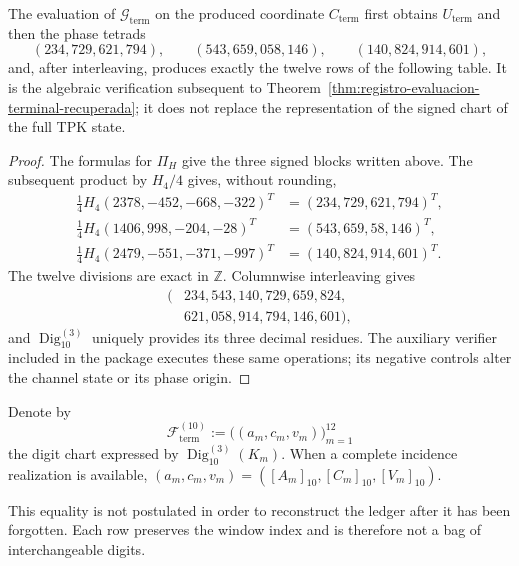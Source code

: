 \begin{proposition}
\label{prop:registro-generacion-modular-terminal}
The evaluation of \(\mathcal G_{\mathrm{term}}\) on the produced coordinate
\(C_{\mathrm{term}}\) first obtains \(U_{\mathrm{term}}\) and then the phase
tetrads
\[
 (234,729,621,794),\qquad(543,659,058,146),\qquad
 (140,824,914,601),
\]
and, after interleaving, produces exactly the twelve rows of the following
table. It is the algebraic verification subsequent to
Theorem~\ref{thm:registro-evaluacion-terminal-recuperada}; it does not replace
the representation of the signed chart of the full TPK state.
\end{proposition}

\begin{proof}
The formulas for \(\Pi_H\) give the three signed blocks written above. The
subsequent product by \(H_4/4\) gives, without rounding,
\begin{align*}
 \tfrac14H_4(2378,-452,-668,-322)^T&=(234,729,621,794)^T,\\
 \tfrac14H_4(1406,998,-204,-28)^T&=(543,659,58,146)^T,\\
 \tfrac14H_4(2479,-551,-371,-997)^T&=(140,824,914,601)^T.
\end{align*}
The twelve divisions are exact in \(\mathbb Z\). Columnwise interleaving gives
\[
 \begin{split}
 (&234,543,140,729,659,824,\\
  &621,058,914,794,146,601),
 \end{split}
\]
and \(\operatorname{Dig}_{10}^{(3)}\) uniquely provides its three decimal
residues. The auxiliary verifier included in the package executes these same
operations; its negative controls alter the channel state or its phase origin.
\end{proof}

Denote by
\[
 \mathscr F_{\mathrm{term}}^{(10)}
 :=\bigl((a_m,c_m,v_m)\bigr)_{m=1}^{12}
\]
the digit chart expressed by \(\operatorname{Dig}_{10}^{(3)}(K_m)\).
When a complete incidence realization is available,
\((a_m,\allowbreak c_m,\allowbreak v_m)=([A_m]_{10},\allowbreak[C_m]_{10},\allowbreak[V_m]_{10})\).

This equality is not
postulated in order to reconstruct the ledger after it has been forgotten.
Each row preserves the window index and is therefore not a bag of
interchangeable digits.

